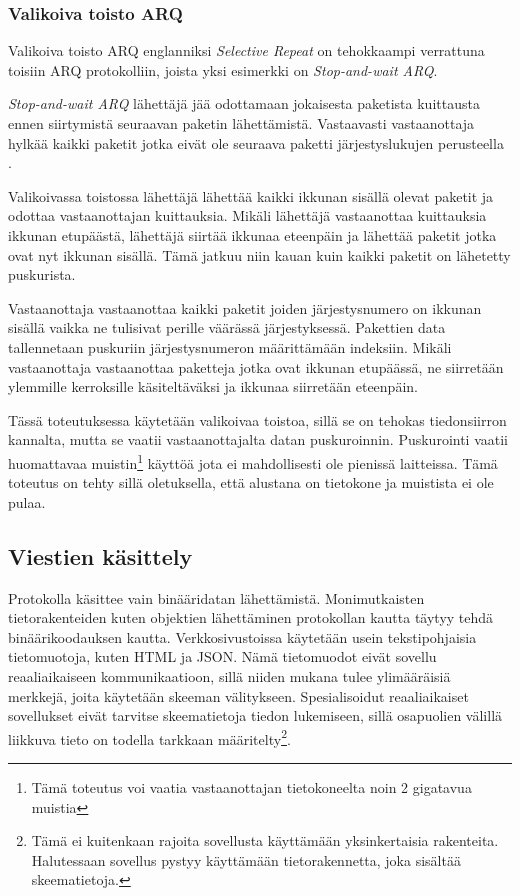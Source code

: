 \documentclass[a4paper,12pt]{article}
\begin{document}
    \subsubsection{Valikoiva toisto ARQ}\label{subsec:valikoiva_toisto}
    Valikoiva toisto ARQ englanniksi \textit{Selective Repeat} on tehokkaampi verrattuna toisiin ARQ protokolliin, joista yksi esimerkki on \textit{Stop-and-wait ARQ}.

    \begin{framed}
        \textit{Stop-and-wait ARQ} lähettäjä jää odottamaan jokaisesta paketista kuittausta ennen siirtymistä seuraavan paketin lähettämistä. Vastaavasti vastaanottaja hylkää kaikki paketit jotka eivät ole seuraava paketti järjestyslukujen perusteella \cite{StopAndWaitARQ}.
    \end{framed}

    Valikoivassa toistossa lähettäjä lähettää kaikki ikkunan sisällä olevat paketit ja odottaa vastaanottajan kuittauksia. Mikäli lähettäjä vastaanottaa kuittauksia ikkunan etupäästä, lähettäjä siirtää ikkunaa eteenpäin ja lähettää paketit jotka ovat nyt ikkunan sisällä. Tämä jatkuu niin kauan kuin kaikki paketit on lähetetty puskurista. \par

    Vastaanottaja vastaanottaa kaikki paketit joiden järjestysnumero on ikkunan sisällä vaikka ne tulisivat perille väärässä järjestyksessä. Pakettien data tallennetaan puskuriin järjestysnumeron määrittämään indeksiin. Mikäli vastaanottaja vastaanottaa paketteja jotka ovat ikkunan etupäässä, ne siirretään ylemmille kerroksille käsiteltäväksi ja ikkunaa siirretään eteenpäin.

    Tässä toteutuksessa käytetään valikoivaa toistoa, sillä se on tehokas tiedonsiirron kannalta, mutta se vaatii vastaanottajalta datan puskuroinnin. Puskurointi vaatii huomattavaa muistin\footnote{Tämä toteutus voi vaatia vastaanottajan tietokoneelta noin 2 gigatavua muistia} käyttöä jota ei mahdollisesti ole pienissä laitteissa. Tämä toteutus on tehty sillä oletuksella, että alustana on tietokone ja muistista ei ole pulaa.\par

    \subsection{Viestien käsittely}
    Protokolla käsittee vain binääridatan lähettämistä. Monimutkaisten tietorakenteiden kuten objektien lähettäminen protokollan kautta täytyy tehdä binäärikoodauksen kautta. Verkkosivustoissa käytetään usein tekstipohjaisia tietomuotoja, kuten HTML ja JSON. Nämä tietomuodot eivät sovellu reaaliaikaiseen kommunikaatioon, sillä niiden mukana tulee ylimääräisiä merkkejä, joita käytetään skeeman välitykseen. Spesialisoidut reaaliaikaiset sovellukset eivät tarvitse skeematietoja tiedon lukemiseen, sillä osapuolien välillä liikkuva tieto on todella tarkkaan määritelty\footnote{Tämä ei kuitenkaan rajoita sovellusta käyttämään yksinkertaisia rakenteita. Halutessaan sovellus pystyy käyttämään tietorakennetta, joka sisältää skeematietoja.}. \par
\end{document}
